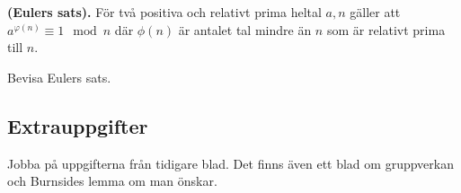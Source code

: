 \documentclass[11pt,fleqn]{book} %
\begin{document}
\begin{theoremeT} \textbf{(Eulers sats).} 
  För två positiva och relativt prima heltal \(a, n\) gäller att \(a ^{\varphi (n)} \equiv 1 \mod n\) där \(\phi (n)\) är antalet tal mindre än \(n\) som är relativt prima till \(n\).
\end{theoremeT}

\begin{problem}
  Bevisa Eulers sats.
\end{problem}

\subsection*{Extrauppgifter}
Jobba på uppgifterna från tidigare blad. Det finns även ett blad om gruppverkan och Burnsides lemma om man önskar.
\end{document}
